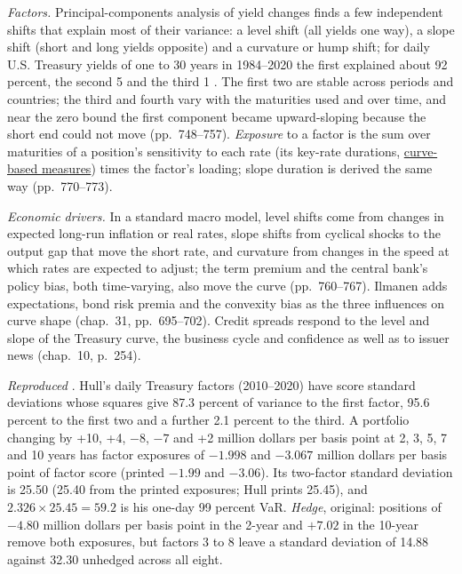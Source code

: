 \begin{qfmethod}\label{meth:yield-curve-factor-exposures}
 \emph{Factors.} Principal-components analysis of yield changes finds a few independent shifts that explain most of their variance: a level shift (all yields one way), a slope shift (short and long yields opposite) and a curvature or hump shift; for daily U.S. Treasury yields of one to 30 years in 1984--2020 the first explained about 92 percent, the second 5 and the third 1 \citep[chap.~33, pp.~745--747]{s7-fabozzifixed}. The first two are stable across periods and countries; the third and fourth vary with the maturities used and over time, and near the zero bound the first component became upward-sloping because the short end could not move (pp.~748--757). \emph{Exposure} to a factor is the sum over maturities of a position's sensitivity to each rate (its key-rate durations, \hyperref[meth:curve-based-empirical-duration]{curve-based measures}) times the factor's loading; slope duration is derived the same way (pp.~770--773).

\emph{Economic drivers.} In a standard macro model, level shifts come from changes in expected long-run inflation or real rates, slope shifts from cyclical shocks to the output gap that move the short rate, and curvature from changes in the speed at which rates are expected to adjust; the term premium and the central bank's policy bias, both time-varying, also move the curve (pp.~760--767). Ilmanen adds expectations, bond risk premia and the convexity bias as the three influences on curve shape (chap.~31, pp.~695--702). Credit spreads respond to the level and slope of the Treasury curve, the business cycle and confidence as well as to issuer news (chap.~10, p.~254).

 \emph{Reproduced} \citep[sec.~22.9, pp.~534--537]{s7-hulloptions}. Hull's daily Treasury factors (2010--2020) have score standard deviations whose squares give 87.3 percent of variance to the first factor, 95.6 percent to the first two and a further 2.1 percent to the third. A portfolio changing by +10, +4, $-8$, $-7$ and +2 million dollars per basis point at 2, 3, 5, 7 and 10 years has factor exposures of $-1.998$ and $-3.067$ million dollars per basis point of factor score (printed $-1.99$ and $-3.06$). Its two-factor standard deviation is 25.50 (25.40 from the printed exposures; Hull prints 25.45), and $2.326\times25.45=59.2$ is his one-day 99 percent VaR. \emph{Hedge}, original: positions of $-4.80$ million dollars per basis point in the 2-year and $+7.02$ in the 10-year remove both exposures, but factors 3 to 8 leave a standard deviation of 14.88 against 32.30 unhedged across all eight.


\end{qfmethod}
